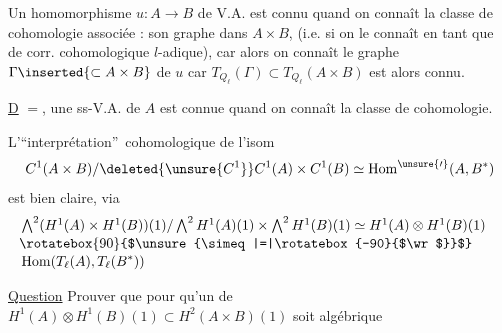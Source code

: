 Un homomorphisme $u:A\to B$ de V.A. est connu quand on connaît la classe de cohomologie associée : son graphe dans $A\times B$,  (i.e. si on le connaît en tant que  de corr. cohomologique $l$-adique), car alors on connaît le graphe $\Gamma\inserted{\subset A\times B}$ de $u$ car $T_{Q_\ell}(\Gamma)\subset T_{Q_\ell}(A\times B)$ est alors connu.

\uline{D} $=$, une ss-V.A. de $A$ est connue quand on connaît la classe de cohomologie.

L'\textquotedblleft interprétation\textquotedblright\ cohomologique de l'isom
\[
 C^1(A\times B)/\deleted{\unsure{C^1}} C^1(A)\times C^1(B)\simeq\operatorname{Hom}^{\unsure{\prime}}(A,B^*)
\]
est bien claire, via
\[
\begin{aligned}
&\textstyle\bigwedge^2(H^1(A)\times H^1(B))(1)/\bigwedge^2 H^1(A)(1)\times\bigwedge^2 H^1(B)(1)
 \simeq H^1(A)\otimes H^1(B)(1)\\[-2pt]
&\hfill \rotatebox{90}{$\unsure{\simeq|=|\rotatebox{-90}{$\wr$}}$}\qquad\\[-2pt]
&\hfill \operatorname{Hom}(T_\ell(A),T_\ell(B^*))
\end{aligned}
\]

\uline{Question} Prouver que pour qu'un  de $H^1(A)\otimes H^1(B)(1)\subset H^2(A\times B)(1)$ soit algébrique

